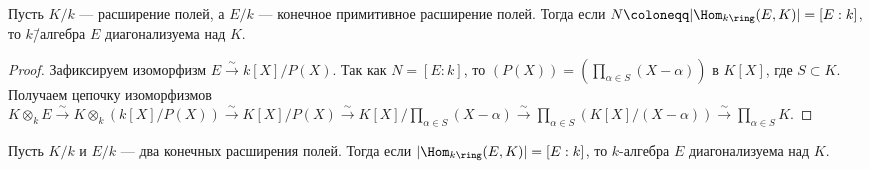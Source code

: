 \documentclass[
	extrafontsizes,
	11pt,
	hyphens,
]{memoir}
\begin{document}
\begin{lemma}
Пусть \(K/k\) --- расширение полей, а \(E/k\) --- конечное примитивное расширение полей.
\label{lem:PrimFieldDiag}
Тогда если \(N \coloneqq \lvert \Hom_{k\ring}(E,K) \rvert = [E : k]\), то
\(k\)\=/алгебра \(E\) диагонализуема над \(K\).
\end{lemma}


\begin{proof}
Зафиксируем изоморфизм \(E \xrightarrow{\sim} k[X]/P(X)\).
Так как
\(N = [E : k]\),
то \((P(X)) = (\prod_{\alpha \in S} (X - \alpha))\) в \(K[X]\), где \(S \subset K\).
Получаем цепочку изоморфизмов
\(
K \otimes_k E
\xrightarrow{\sim}
K \otimes_k (k[X]/P(X))
\xrightarrow{\sim}
K[X]/P(X)
\xrightarrow{\sim}
K[X]/\prod_{\alpha \in S} (X - \alpha)
\xrightarrow{\sim}
\prod_{\alpha \in S} (K[X]/(X - \alpha))
\xrightarrow{\sim}
\prod_{\alpha \in S} K
\).
\end{proof}

\begin{theorem} \label{thm:MaxSymFieldExt}
Пусть \(K/k\) и \(E/k\) --- два конечных расширения полей.
Тогда если \(\lvert \Hom_{k\ring}(E,K) \rvert = [E : k]\), то
\(k\)-ал\-ге\-бра \(E\) диагонализуема над \(K\).
\end{theorem}
\end{document}
